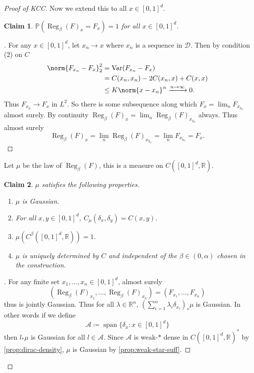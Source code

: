 \documentclass[fontsize=12pt, DIV=10]{scrreprt}
\newtheorem{claim}{Claim}
\theoremstyle{remark}
\newenvironment{subproof}[1][\proofname]{%
  \renewcommand{\qedsymbol}{$\blacksquare$}%
  \begin{proof}[#1]%
}{%
  \end{proof}%
}
\newcommand{\defeq}{\coloneqq}
\newcommand{\R}{\mathbb R}
\newcommand{\prob}{\mathbb P}
\newcommand{\calA}{\mathcal A}
\newcommand{\calD}{\mathcal D}
\DeclareMathOperator{\reg}{Reg}
\DeclareMathOperator{\var}{Var}
\DeclareMathOperator{\spn}{span}
\newcommand{\unitbox}{\ensuremath{[0,1]^d}}
\begin{document}
\begin{proof}[Proof of KCC]
	Now we extend this to all $x \in \unitbox$.
	\begin{claim}
		$\prob(\reg_{\beta}(F)_x = F_x) = 1$ for all $x \in [0, 1]^d$.
	\end{claim}
	\begin{subproof}
		For any $x \in \unitbox$, let $x_n \to x$ where $x_n$ is a sequence in $\calD$. Then by condition (2) on $C$
		\begin{align}
			\norm{F_{x_n} - F_x}_2^2
			&= \var(F_{x_n} - F_x) \\
			&= C(x_n, x_n) - 2C(x_n, x) + C(x, x) \\
			&\leq K \norm{x - x_n}^{\alpha} \xrightarrow{n \to \infty} 0.
		\end{align}
		Thus $F_{x_n} \to F_x$ in $L^2$. So there is some subsequence along which $F_x = \lim_n F_{x_{k_n}}$ almost surely. By continuity $\reg_{\beta}(F)_x = \lim_n \reg_{\beta}(F)_{x_{k_n}}$ always. Thus almost surely
		\begin{equation}
			\reg_{\beta}(F)_x = \lim_n \reg_{\beta}(F)_{x_{k_n}}
			= \lim_n F_{x_{k_n}} = F_x.
		\end{equation}
	\end{subproof}

	Let $\mu$ be the law of $\reg_{\beta}(F)$, this is a measure on $C(\unitbox, \R)$. 
	\begin{claim}
		$\mu$ satisfies the following properties.
		\begin{enumerate}
			\item $\mu$ is Gaussian.
			\item For all $x, y \in \unitbox$, $C_{\mu}(\delta_x, \delta_y) = C(x, y)$.
			\item $\mu(C^{\beta}(\unitbox, \R)) = 1$.
			\item $\mu$ is uniquely determined by $C$ and independent of the $\beta \in (0, \alpha)$ chosen in the construction.
		\end{enumerate}
	\end{claim}
	\begin{subproof}
		For any finite set $x_1, \ldots, x_n \in \unitbox$, almost surely
		\begin{equation}
			(\reg_{\beta}(F)_{x_1}, \ldots, \reg_{\beta}(F)_{x_n})
			= (F_{x_1}, \ldots, F_{x_n})
		\end{equation}
		thus is jointly Gaussian. Thus for all $\lambda \in \R^n$, $(\sum_{i=1}^n \lambda_i \delta_{x_i})_* \mu$ is Gaussian. In other words if we define
		\begin{equation}
			\calA \defeq \spn\{ \delta_x : x \in [0, 1]^d\}
		\end{equation}
		then $l_* \mu$ is Gaussian for all $l \in \calA$. Since $\calA$ is weak-$*$ dense in $C([0, 1]^d, \R)^*$ by \vref{prop:dirac-density}, $\mu$ is Gaussian by \vref{prop:weak-star-suff}.


\end{subproof}
\end{proof}
\end{document}
